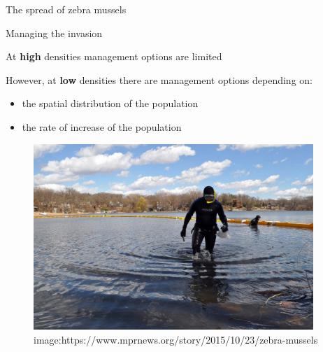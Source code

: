 \documentclass[ignorenonframetext,]{beamer}
\providecommand{\tightlist}{%
  \setlength{\itemsep}{0pt}\setlength{\parskip}{0pt}}
\begin{document}
\begin{frame}{The spread of zebra mussels}
\begin{block}{Managing the invasion}

At \textbf{high} densities management options are limited

However, at \textbf{low} densities there are management options
depending on:

\begin{itemize}
\tightlist
\item
  the spatial distribution of the population
\item
  the rate of increase of the population
\end{itemize}

\begin{figure}

{\centering \includegraphics[width=400px]{../Figures/DiversChristmas} 

}

\caption{image:https://www.mprnews.org/story/2015/10/23/zebra-mussels}\label{fig:unnamed-chunk-2}
\end{figure}

\end{block}

\end{frame}
\end{document}
